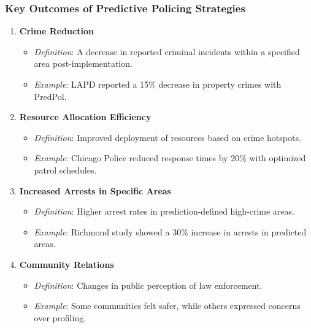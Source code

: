 \documentclass[aspectratio=169]{beamer}
\begin{document}
\begin{frame}[fragile]
    \frametitle{Key Outcomes of Predictive Policing Strategies}
    \begin{enumerate}
        \item \textbf{Crime Reduction}
        \begin{itemize}
            \item \textit{Definition}: A decrease in reported criminal incidents within a specified area post-implementation.
            \item \textit{Example}: LAPD reported a 15\% decrease in property crimes with PredPol.
        \end{itemize}

        \item \textbf{Resource Allocation Efficiency}
        \begin{itemize}
            \item \textit{Definition}: Improved deployment of resources based on crime hotspots.
            \item \textit{Example}: Chicago Police reduced response times by 20\% with optimized patrol schedules.
        \end{itemize}
        
        \item \textbf{Increased Arrests in Specific Areas}
        \begin{itemize}
            \item \textit{Definition}: Higher arrest rates in prediction-defined high-crime areas.
            \item \textit{Example}: Richmond study showed a 30\% increase in arrests in predicted areas.
        \end{itemize}
        
        \item \textbf{Community Relations}
        \begin{itemize}
            \item \textit{Definition}: Changes in public perception of law enforcement.
            \item \textit{Example}: Some communities felt safer, while others expressed concerns over profiling.
        \end{itemize}
    \end{enumerate}
\end{frame}
\end{document}
